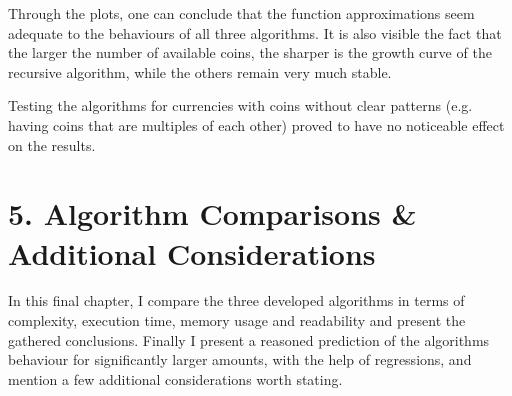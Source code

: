\documentclass[shortpaper]{revdetua}
\begin{document}
Through the plots, one can conclude that the function approximations seem
adequate to the behaviours of all three algorithms.
It is also visible the fact that the larger the number of available coins, the
sharper is the growth curve of the recursive algorithm, while the others remain 
very much stable.

Testing the algorithms for currencies with coins without clear patterns (e.g. 
having coins that are multiples of each other) proved to have no noticeable 
effect on the results.

\newpage
\section*{5. Algorithm Comparisons \& Additional Considerations}

In this final chapter, I compare the three developed algorithms in terms of 
complexity, execution time, memory usage and readability and present the 
gathered conclusions.
Finally I present a reasoned prediction of the algorithms behaviour for 
significantly larger amounts, with the help of regressions, and mention a few 
additional considerations worth stating. \\
\end{document}
